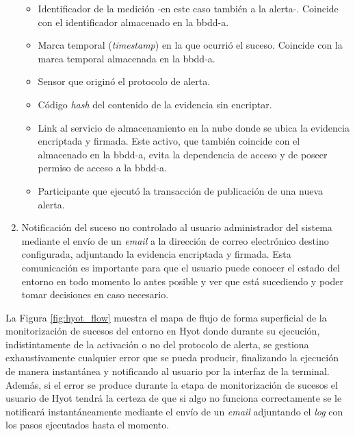 \documentclass[12pt,a4paper, twoside]{report}
\begin{document}
\begin{enumerate}
				\begin{itemize}
					\item Identificador de la medición -en este caso también a la alerta-. Coincide con el identificador almacenado en la \gls{bbdd-a}.
					\item Marca temporal (\textit{timestamp}) en la que ocurrió el suceso. Coincide con la marca temporal almacenada en la \gls{bbdd-a}.
					\item Sensor que originó el protocolo de alerta.
					\item Código \textit{hash} del contenido de la evidencia sin encriptar.
					\item Link al servicio de almacenamiento en la nube donde se ubica la evidencia encriptada y firmada. Este activo, que también coincide con el almacenado en la \gls{bbdd-a}, evita la dependencia de acceso y de poseer permiso de acceso a la \gls{bbdd-a}.
					\item Participante que ejecutó la transacción de publicación de una nueva alerta.
				\end{itemize}

		\item Notificación del suceso no controlado al usuario administrador del sistema mediante el envío de un \textit{email} a la dirección de correo electrónico destino configurada, adjuntando la evidencia encriptada y firmada. Esta comunicación es importante para que el usuario puede conocer el estado del entorno en todo momento lo antes posible y ver que está sucediendo y poder tomar decisiones en caso necesario.
	
	\end{enumerate}
		
	La Figura \ref{fig:hyot_flow} muestra el mapa de flujo de forma superficial de la monitorización de sucesos del entorno en Hyot donde durante su ejecución, indistintamente de la activación o no del protocolo de alerta, se gestiona exhaustivamente cualquier error que se pueda producir, finalizando la ejecución de manera instantánea y notificando al usuario por la interfaz de la terminal. Además, si el error se produce durante la etapa de monitorización de sucesos el usuario de Hyot tendrá la certeza de que si algo no funciona correctamente se le notificará instantáneamente mediante el envío de un \textit{email} adjuntando el \textit{log} con los pasos ejecutados hasta el momento.
	
	\newpage
	
\end{document}
